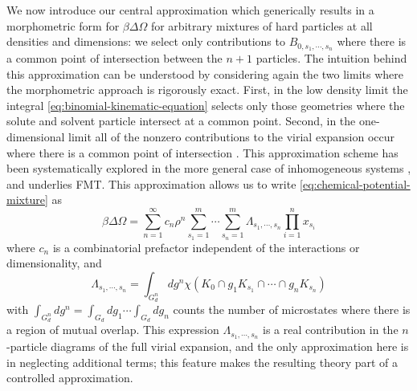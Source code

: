 \documentclass[11pt,twoside]{report}
\begin{document}
We now introduce our central approximation which generically results in a morphometric form for $\beta \Delta \Omega$ for arbitrary mixtures of hard particles at all densities and dimensions: we select only contributions to $B_{0, s_1, \cdots, s_n}$ where there is a common point of intersection between the $n+1$ particles.
The intuition behind this approximation can be understood by considering again the two limits where the morphometric approach is rigorously exact.
First, in the low density limit the integral \eqref{eq:binomial-kinematic-equation} selects only those geometries where the solute and solvent particle intersect at a common point.
Second, in the one-dimensional limit all of the nonzero contributions to the virial expansion occur where there is a common point of intersection \cite{MarechalPRE2014}.
This approximation scheme has been systematically explored in the more general case of inhomogeneous systems \cite{LeithallPRE2011,KordenPRE2012,MarechalPRE2014}, and underlies FMT.
This approximation allows us to write \eqref{eq:chemical-potential-mixture} as
\begin{equation}\label{eq:insertion-with-lambda}
  \beta \Delta \Omega
  =
  \sum_{n=1}^\infty
  c_n
  \rho^n
  \sum_{s_1=1}^m \cdots \sum_{s_n=1}^m
  \Lambda_{s_1, \cdots, s_n}
  \prod_{i=1}^n x_{s_i}
\end{equation}
where $c_n$ is a combinatorial prefactor independent of the interactions or dimensionality, and
\begin{equation}\label{eq:n-particle-intersection-integral}
  \Lambda_{s_1, \cdots, s_n}
  =
  \int_{G_d^n} dg^n \chi(K_0 \cap g_1 K_{s_1} \cap \cdots \cap g_n K_{s_n})
\end{equation}
with $\int_{G_d^n} dg^n = \int_{G_d} dg_1 \cdots \int_{G_d} dg_n$ counts the number of microstates where there is a region of mutual overlap.
This expression $\Lambda_{s_1, \cdots, s_n}$ is a real contribution in the $n$-particle diagrams of the full virial expansion, and the only approximation here is in neglecting additional terms; this feature makes the resulting theory part of a controlled approximation.
\end{document}
